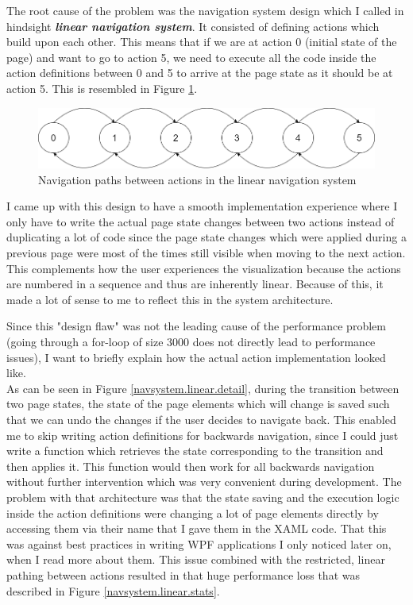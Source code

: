 \par

The root cause of the problem was the navigation system design which I called in hindsight \textbf{\textit{linear navigation system}}. It consisted of defining actions which build upon each other. This means that if we are at action 0 (initial state of the page) and want to go to action 5, we need to execute all the code inside the action definitions between 0 and 5 to arrive at the page state as it should be at action 5. This is resembled in Figure \ref{navsystem.linear.overview}.

\begin{figure}
\caption{Navigation paths between actions in the linear navigation system}
\label{navsystem.linear.overview}
\includegraphics[width=\textwidth]{figures/navigationsystem-linear-overview.png}
\end{figure}

I came up with this design to have a smooth implementation experience where I only have to write the actual page state changes between two actions instead of duplicating a lot of code since the page state changes which were applied during a previous page were most of the times still visible when moving to the next action. This complements how the user experiences the visualization because the actions are numbered in a sequence and thus are inherently linear. Because of this, it made a lot of sense to me to reflect this in the system architecture.

\par

Since this "design flaw" was not the leading cause of the performance problem (going through a for-loop of size 3000 does not directly lead to performance issues), I want to briefly explain how the actual action implementation looked like.\\
As can be seen in Figure \ref{navsystem.linear.detail}, during the transition between two page states, the state of the page elements which will change is saved such that we can undo the changes if the user decides to navigate back. This enabled me to skip writing action definitions for backwards navigation, since I could just write a function which retrieves the state corresponding to the transition and then applies it. This function would then work for all backwards navigation without further intervention which was very convenient during development.
The problem with that architecture was that the state saving and the execution logic inside the action definitions were changing a lot of page elements directly by accessing them via their name that I gave them in the XAML code. That this was against best practices in writing WPF applications I only noticed later on, when I read more about them. This issue combined with the restricted, linear pathing between actions resulted in that huge performance loss that was described in Figure \ref{navsystem.linear.stats}.

